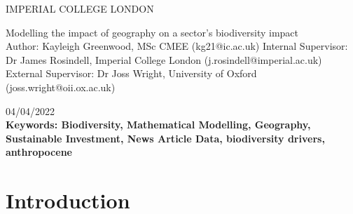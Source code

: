 \documentclass[11pt, a4paper, titlepage]{article}
\begin{document}
    \begin{titlepage}
    \begin{center}
            {\large IMPERIAL COLLEGE LONDON}
    \end{center}
    
    \vspace*{\fill}
    
    \begin{center}
        {\Huge Modelling the impact of geography on a sector's biodiversity impact}
        \\[2in]
        Author: Kayleigh Greenwood, MSc CMEE (kg21@ic.ac.uk)
        \bigskip
        \newline
       Internal Supervisor: Dr James Rosindell, Imperial College London (j.rosindell@imperial.ac.uk)
       \bigskip
       \newline
        External Supervisor: Dr Joss Wright, University of Oxford (joss.wright@oii.ox.ac.uk)
        \bigskip
        \newline

        04/04/2022
        \\[2in]
        
        {\bfseries Keywords: Biodiversity, Mathematical Modelling, Geography, Sustainable Investment, News Article Data, biodiversity drivers, anthropocene }

        

    \end{center}
    
    \vspace{\fill}
    
    \end{titlepage}

    \section*{Introduction}
    
\end{document}
